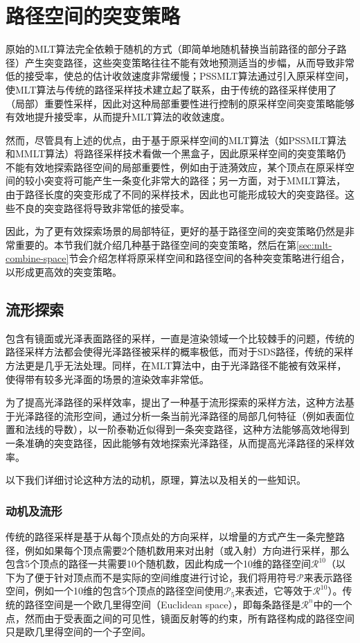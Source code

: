 \section{路径空间的突变策略}\label{sec:pt-manifold}
原始的MLT算法完全依赖于随机的方式（即简单地随机替换当前路径的部分子路径）产生突变路径，这些突变策略往往不能有效地预测适当的步幅，从而导致非常低的接受率，使总的估计收敛速度非常缓慢；PSSMLT算法通过引入原采样空间，使MLT算法与传统的路径采样技术建立起了联系，由于传统的路径采样使用了（局部）重要性采样，因此对这种局部重要性进行控制的原采样空间突变策略能够有效地提升接受率，从而提升MLT算法的收敛速度。

然而，尽管具有上述的优点，由于基于原采样空间的MLT算法（如PSSMLT算法和MMLT算法）将路径采样技术看做一个黑盒子，因此原采样空间的突变策略仍不能有效地探索路径空间的局部重要性，例如由于涟漪效应，某个顶点在原采样空间的较小突变将可能产生一条变化非常大的路径；另一方面，对于MMLT算法，由于路径长度的突变形成了不同的采样技术，因此也可能形成较大的突变路径。这些不良的突变路径将导致非常低的接受率。

因此，为了更有效探索场景的局部特征，更好的基于路径空间的突变策略仍然是非常重要的。本节我们就介绍几种基于路径空间的突变策略，然后在第\ref{sec:mlt-combine-space}节会介绍怎样将原采样空间和路径空间的各种突变策略进行组合，以形成更高效的突变策略。




\subsection{流形探索}\label{sec:mlt-me}
包含有镜面或光泽表面路径的采样，一直是渲染领域一个比较棘手的问题，传统的路径采样方法都会使得光泽路径被采样的概率极低，而对于SDS路径，传统的采样方法更是几乎无法处理。同样，在MLT算法中，由于光泽路径不能被有效采样，使得带有较多光泽面的场景的渲染效率非常低。

为了提高光泽路径的采样效率，\cite{a:ManifoldExplorationAMarkovChainMonteCarloTechniqueforRenderingSceneswithDifficultSpecularTransport}提出了一种基于流形探索的采样方法，这种方法基于光泽路径的流形空间，通过分析一条当前光泽路径的局部几何特征（例如表面位置和法线的导数），以一阶泰勒近似得到一条突变路径，这种方法能够高效地得到一条准确的突变路径，因此能够有效地探索光泽路径，从而提高光泽路径的采样效率。

以下我们详细讨论这种方法的动机，原理，算法以及相关的一些知识。



\subsubsection{动机及流形}\label{sec:mlt-manifold}
传统的路径采样是基于从每个顶点处的方向采样，以增量的方式产生一条完整路径，例如如果每个顶点需要2个随机数用来对出射（或入射）方向进行采样，那么包含5个顶点的路径一共需要10个随机数，因此构成一个10维的路径空间$\mathcal{R}^{10}$（以下为了便于针对顶点而不是实际的空间维度进行讨论，我们将用符号$\mathcal{P}$来表示路径空间，例如一个10维的包含5个顶点的路径空间使用$\mathcal{P}_5$来表述，它等效于$\mathcal{R}^{10}$）。传统的路径空间是一个欧几里得空间（Euclidean space），即每条路径是$\mathcal{R}^{n}$中的一个点，然而由于受表面之间的可见性，镜面反射等的约束，所有路径构成的路径空间只是欧几里得空间的一个子空间。

